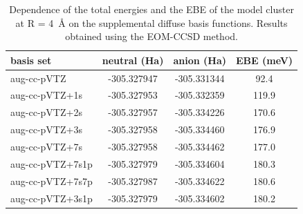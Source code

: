 \begin{table}
    \caption{\label{tab:diffusebasistuning}Dependence of the total energies and the EBE of the model  cluster at R = \SI{4}{\angstrom} on the supplemental diffuse basis functions. Results obtained using the EOM-CCSD method.}
\begin{tabular}{l c c c}
basis set            & neutral (Ha)  & anion (Ha)    & EBE (meV)            \\
\hline
aug-cc-pVTZ      & -305.327947          & -305.331344          &   92.4            \\
aug-cc-pVTZ+1s   & -305.327953          & -305.332359          &  119.9             \\
aug-cc-pVTZ+2s   & -305.327957          & -305.334226          &  170.6              \\
aug-cc-pVTZ+3s   & -305.327958          & -305.334460          &  176.9              \\
aug-cc-pVTZ+7s   & -305.327958          & -305.334462          &  177.0              \\ \hline
aug-cc-pVTZ+7s1p & -305.327979          & -305.334604          &  180.3              \\
aug-cc-pVTZ+7s7p & -305.327987          & -305.334622          &  180.6              \\ \hline
aug-cc-pVTZ+3s1p & -305.327979          & -305.334602          &  180.2     
\end{tabular}
\end{table}


